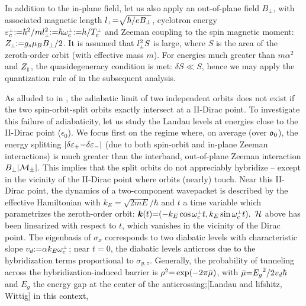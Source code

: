 \documentclass[aps, prb, showpacs, twocolumn, notitlepage, superscriptaddress]{revtex4-1}
\begin{document}
In addition to the in-plane field, let us also apply an out-of-plane field $B_{\perp}$, with associated magnetic length $l_{\scriptscriptstyle{\perp}}{=}\sqrt{\hbar/eB_{\perp}}$, cyclotron energy $\varepsilon^{\scriptscriptstyle{\perp}}_c{:}{=}\hbar^2/ml_{\scriptscriptstyle{\perp}}^2{:}{=}\hbar \omega_c^{\scriptscriptstyle{\perp}}{:}{=}h/T_c^{\scriptscriptstyle{\perp}}$ and Zeeman coupling to the spin magnetic moment:  $Z_{\scriptscriptstyle{\perp}}{:}{=}{g_s}\mu_B B_{\perp}/2$. It is assumed that $l_{\scriptscriptstyle{\perp}}^2S$ is large, where $S$ is the area of the zeroth-order orbit (with effective mass $m$). For energies much greater than $m\alpha^2$ and $Z_{\scriptscriptstyle{\parallel}}$, the quasidegeneracy condition is met: $\delta S{\ll}S$, hence we may apply the quantization rule of  in the subsequent analysis. 

As alluded to in , the adiabatic limit of two independent orbits does not exist if the two spin-orbit-split orbits exactly intersect at a II-Dirac point. To investigate this failure of adiabaticity, let us study the Landau levels at energies close to the II-Dirac point ($\epsilon_0$). We focus first on the regime where, on average (over $\mathfrak{o}_0$), the energy splitting $|\delta \varepsilon_+{-}\delta \varepsilon_-|$ (due to both  spin-orbit and in-plane Zeeman interactions) is much greater than the interband, out-of-plane Zeeman interaction $B_{\perp}|{\cal M}_{\pm}|$. This implies that the split orbits do not appreciably hybridize -- except in the vicinity of the II-Dirac point where orbits (nearly) touch. Near this II-Dirac point, the dynamics of a two-component wavepacket is described 
 by the effective Hamiltonian
with $k_E{=}\sqrt{2mE}/\hbar$ and  $t$ a time variable which parametrizes the zeroth-order orbit:
$\boldsymbol{k}(t){=}({-}k_E \cos \omega_c^{\scriptscriptstyle{\perp}} t, k_E \sin \omega_c^{\scriptscriptstyle{\perp}} t ).$ 
${\cal H}$ above has been linearized with respect to  $t$, which vanishes in the vicinity of the Dirac point. The eigenbasis of $\sigma_x$ corresponds to two diabatic levels with characteristic slope $v_d{:}{=}\alpha k_E\omega^{\scriptscriptstyle{\perp}}_c$; near $t{=}0$, the diabatic levels anticross  due to the hybridization terms proportional to $\sigma_{y,z}$. Generally, the probability of tunneling across the hybridization-induced barrier is  $\rho^2{=}\exp(-2\pi\bar{\mu})$, with $\bar{\mu}{=}{E_g}^2/{2v_d \hbar}$ and $E_g$ the energy gap at the center of the anticrossing;[Landau and lifshitz, Wittig] in this context,
\end{document}
